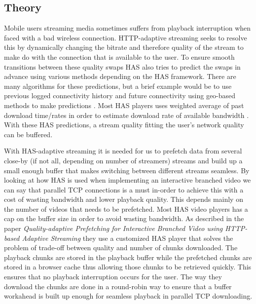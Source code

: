 \documentclass[9pt,a4paper]{acmproc}
\begin{document}
\subsection{Theory}
Mobile users streaming media sometimes suffers from playback interruption when faced with a bad wireless connection. HTTP-adaptive streaming seeks to resolve this by dynamically changing the bitrate and therefore quality of the stream to make do with the connection that is available to the user. To ensure smooth transitions between these quality swaps HAS also tries to predict the swaps in advance using various methods depending on the HAS framework. There are many algorithms for these predictions, but a brief example would be to use previous logged connectivity history and future connectivity using geo-based methods to make predictions \cite{gtube}. Most HAS players uses weighted average of past download time/rates in order to estimate download rate of available bandwidth \cite[p.~317-326]{qualbranch}. With these HAS predictions, a stream quality fitting the user’s network quality can be buffered.\cite{gtube}

With HAS-adaptive streaming it is needed for us to prefetch data from several close-by (if not all, depending on number of streamers) streams and build up a small enough buffer that makes switching between different streams seamless. By looking at how HAS is used when implementing an interactive branched video we can say that parallel TCP connections is a must in-order to achieve this with a cost of wasting bandwidth and lower playback quality. This depends mainly on the number of videos that needs to be prefetched. Most HAS video players has a cap on the buffer size in order to avoid wasting bandwidth. As described in the paper \textit{Quality-adaptive Prefetching for Interactive Branched Video using HTTP-based Adaptive Streaming} they use a customized HAS player that solves the problem of trade-off between quality and number of chunks downloaded. The playback chunks are stored in the playback buffer while the prefetched chunks are stored in a browser cache thus allowing those chunks to be retrieved quickly. This ensures that no playback interruption occurs for the user. The way they download the chunks are done in a round-robin way to ensure that a buffer workahead is built up enough for seamless playback in parallel TCP downloading. \cite[p.~317-326]{qualbranch} 
\end{document}

